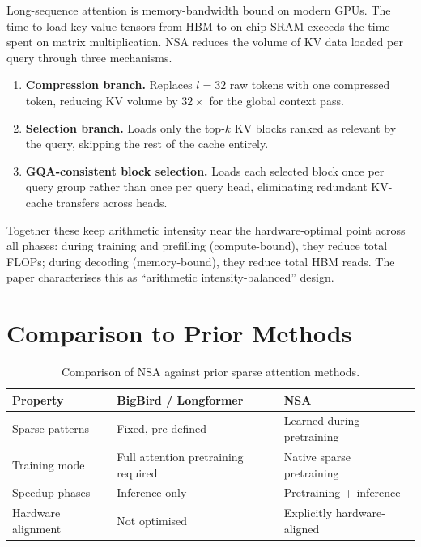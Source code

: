 \documentclass[11pt,letterpaper]{article}
\begin{document}
Long-sequence attention is memory-bandwidth bound on modern GPUs. The time to load key-value
tensors from HBM to on-chip SRAM exceeds the time spent on matrix multiplication. NSA reduces
the volume of KV data loaded per query through three mechanisms.

\begin{enumerate}[nosep]
  \item \textbf{Compression branch.} Replaces $l = 32$ raw tokens with one compressed token,
    reducing KV volume by $32\times$ for the global context pass.
  \item \textbf{Selection branch.} Loads only the top-$k$ KV blocks ranked as relevant by the
    query, skipping the rest of the cache entirely.
  \item \textbf{GQA-consistent block selection.} Loads each selected block once per query group
    rather than once per query head, eliminating redundant KV-cache transfers across heads.
\end{enumerate}

Together these keep arithmetic intensity near the hardware-optimal point across all phases:
during training and prefilling (compute-bound), they reduce total FLOPs; during decoding
(memory-bound), they reduce total HBM reads. The paper characterises this as
``arithmetic intensity-balanced'' design.

\section{Comparison to Prior Methods}

\begin{table}[h]
\centering
\begin{tabularx}{\textwidth}{lXX}
\toprule
\textbf{Property} & \textbf{BigBird / Longformer} & \textbf{NSA} \\
\midrule
Sparse patterns     & Fixed, pre-defined             & Learned during pretraining \\
Training mode       & Full attention pretraining required & Native sparse pretraining \\
Speedup phases      & Inference only                 & Pretraining + inference \\
Hardware alignment  & Not optimised                  & Explicitly hardware-aligned \\
\bottomrule
\end{tabularx}
\caption{Comparison of NSA against prior sparse attention methods.}
\end{table}
\end{document}
